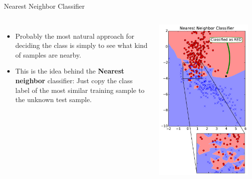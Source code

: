 \documentclass[10pt, aspectratio=169]{beamer} %
\begin{document}
\begin{frame}{Nearest Neighbor Classifier}
\begin{columns}
\begin{itemize}
\item Probably the most natural approach for deciding the class is
simply to see what kind of samples are nearby.
\item This is the idea behind the \textbf{Nearest neighbor} classifier: Just copy
the class label of the most similar training sample to the unknown test sample.
\end{itemize}
\centerline{\includegraphics[width=1.0\columnwidth]{1NN.pdf}}
\end{columns}
\end{frame}
\end{document}
